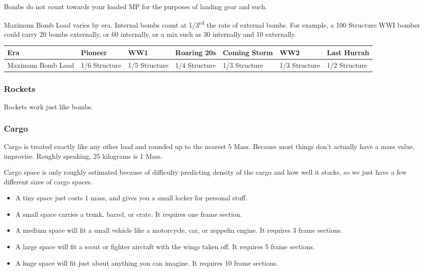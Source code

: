 \documentclass{article}
\begin{document}
Bombs do not count towards your loaded MP for the purposes of landing
gear and such.

Maximum Bomb Load varies by era. Internal bombs count at
1/3\textsuperscript{rd} the rate of external bombs. For example, a 100
Structure WWI bomber could carry 20 bombs externally, or 60 internally,
or a mix such as 30 internally and 10 externally.

\begin{tabular}{|l|l|l|l|l|l|l|}
    \hline
    Era               & Pioneer       & WW1           & Roaring 20s   & Coming Storm & WW2 & Last Hurrah \\\hline
    Maximum Bomb Load & 1/6 Structure & 1/5 Structure & 1/4 Structure & 1/3
    Structure         & 1/3 Structure & 1/2 Structure                                                    \\\hline
\end{tabular}

\subsubsection{Rockets}
\label{_Rockets}

Rockets work just like bombs.

\subsubsection{Cargo}
\label{_Cargo}

Cargo is treated exactly like any other load and rounded up to the
nearest 5 Mass. Because most things don't actually have a mass value,
improvise. Roughly speaking, 25 kilograms is 1 Mass.

Cargo space is only roughly estimated because of difficulty predicting
density of the cargo and how well it stacks, so we just have a few
different sizes of cargo spaces.

\begin{itemize}
    \item          A tiny space just costs 1 mass, and gives you a small locker
          for personal stuff.
    \item          A small space carries a trunk, barrel, or crate. It requires
          one frame section.
    \item          A medium space will fit a small vehicle like a motorcycle, car,
          or zeppelin engine. It requires 3 frame sections.
    \item          A large space will fit a scout or fighter aircraft with the
          wings taken off. It requires 5 frame sections.
    \item          A huge space will fit just about anything you can imagine. It
          requires 10 frame sections.
\end{itemize}
\end{document}
